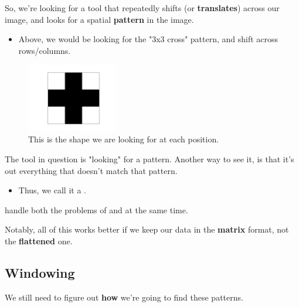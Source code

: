         So, we're looking for a tool that repeatedly shifts (or \textbf{translates}) across our image, and looks for a spatial \textbf{pattern} in the image.

        \begin{itemize}
            \item \miniex Above, we would be looking for the "3x3 cross" pattern, and shift across rows/columns.
        \end{itemize}

        \begin{figure}[H]
            \centering
            \includegraphics[width=40mm,scale=0.5]{images/convolutional_neural_networks_images/crossgrid.png}
            
            \caption*{This is the shape we are looking for at each position.}
        \end{figure}

        The tool in question is "looking" for a pattern. Another way to see it, is that it's  out everything that doesn't match that pattern.
        
        \begin{itemize}
            \item Thus, we call it a .\\
        \end{itemize}

        \begin{concept}
             handle both the problems of  and  at the same time.
        \end{concept}

        Notably, all of this works better if we keep our data in the \textbf{matrix} format, not the \textbf{flattened} one.

    \subsection{Windowing}

        We still need to figure out \textbf{how} we're going to find these patterns. 

